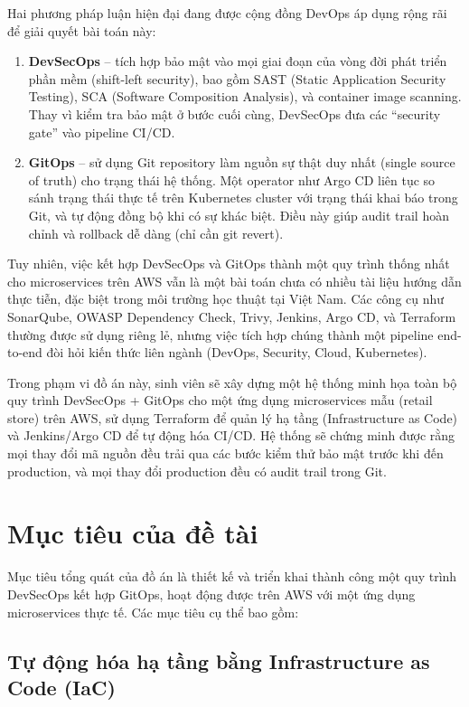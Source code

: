 \documentclass[12pt,a4paper]{article}
\begin{document}
Hai phương pháp luận hiện đại đang được cộng đồng DevOps áp dụng rộng rãi để giải quyết bài toán này:

\begin{enumerate}[leftmargin=*,nosep]
  \item \textbf{DevSecOps} -- tích hợp bảo mật vào mọi giai đoạn của vòng đời phát triển phần mềm (shift-left security), bao gồm SAST (Static Application Security Testing), SCA (Software Composition Analysis), và container image scanning. Thay vì kiểm tra bảo mật ở bước cuối cùng, DevSecOps đưa các ``security gate'' vào pipeline CI/CD.
  \item \textbf{GitOps} -- sử dụng Git repository làm nguồn sự thật duy nhất (single source of truth) cho trạng thái hệ thống. Một operator như Argo CD liên tục so sánh trạng thái thực tế trên Kubernetes cluster với trạng thái khai báo trong Git, và tự động đồng bộ khi có sự khác biệt. Điều này giúp audit trail hoàn chỉnh và rollback dễ dàng (chỉ cần git revert).
\end{enumerate}

Tuy nhiên, việc kết hợp DevSecOps và GitOps thành một quy trình thống nhất cho micro\-services trên AWS vẫn là một bài toán chưa có nhiều tài liệu hướng dẫn thực tiễn, đặc biệt trong môi trường học thuật tại Việt Nam. Các công cụ như SonarQube, OWASP Dependency Check, Trivy, Jenkins, Argo CD, và Terra\-form thường được sử dụng riêng lẻ, nhưng việc tích hợp chúng thành một pipeline end-to-end đòi hỏi kiến thức liên ngành (DevOps, Security, Cloud, Kubernetes).

Trong phạm vi đồ án này, sinh viên sẽ xây dựng một hệ thống minh họa toàn bộ quy trình DevSec\-Ops + GitOps cho một ứng dụng microservices mẫu (retail store) trên AWS, sử dụng Terraform để quản lý hạ tầng (Infrastructure as Code) và Jenkins/Argo CD để tự động hóa CI/CD. Hệ thống sẽ chứng minh được rằng mọi thay đổi mã nguồn đều trải qua các bước kiểm thử bảo mật trước khi đến production, và mọi thay đổi production đều có audit trail trong Git.

\section{Mục tiêu của đề tài}

Mục tiêu tổng quát của đồ án là thiết kế và triển khai thành công một quy trình DevSecOps kết hợp GitOps, hoạt động được trên AWS với một ứng dụng microservices thực tế. Các mục tiêu cụ thể bao gồm:

\subsection{Tự động hóa hạ tầng bằng Infrastructure as Code (IaC)}
\end{document}
